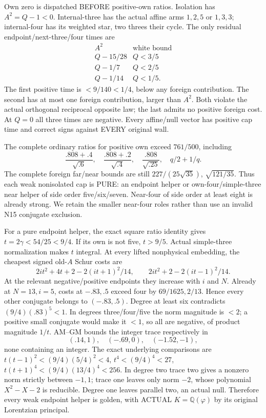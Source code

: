 \documentclass[11pt]{article}
\begin{document}
Own zero is dispatched BEFORE positive-own
ratios.
Isolation has \(A^2=Q-1<0\).
Internal-three has the actual affine arms
\(1,2,5\) or \(1,3,3\); internal-four has its
weighted star, two threes their cycle.
The only residual endpoint/next-three/four
times are
\[
 \begin{array}{c|c}
 A^2&\text{white bound}\\ \hline
 Q-15/28&Q<3/5\\
 Q-1/7&Q<2/5\\
 Q-1/14&Q<1/5 .
 \end{array}
\]
The first positive time is \(<9/140<1/4\),
below any foreign contribution.
The second has at most one foreign contribution,
larger than \(A^2\).
Both violate the actual orthogonal reciprocal
opposite law; the last admits no positive
foreign cost.
At \(Q=0\) all three times are negative.
Every affine/null vector has positive cap time
and correct signs against EVERY original wall.

The complete ordinary ratios for positive own
exceed \(761/500\), including
\[
 {\frac{.808+.4}{\sqrt{.6}}},\quad
 {\frac{.808+.2}{\sqrt{.4}}},\quad
 {\frac{.808}{\sqrt{.25}}},\quad q/2+1/q .
\]
The complete foreign far/near bounds are still
\(227/(25\sqrt{35})\), \(\sqrt{121/35}\).
Thus each weak nonisolated cap is PURE:
an endpoint helper or own-four/simple-three
near helper of side order five/six/seven.
Near-four of side order at least eight is
already strong.
We retain the smaller near-four roles rather
than use an invalid N15 conjugate exclusion.

For a pure endpoint helper, the exact square
ratio identity gives \(t=2\gamma<54/25<9/4\).
If its own is not five, \(t>9/5\).
Actual simple-three normalization makes \(t\)
integral.
At every lifted nonphysical embedding, the
cheapest signed old-\(A\) Schur costs are
\[
 2it^2+4t+2-2(it+1)^2/14,\qquad
 2it^2+2-2(it-1)^2/14 .
\]
At the relevant negative/positive endpoints
they increase with \(i\) and \(N\).
Already at \(N=13,i=5\), costs at \(-.83,.5\)
exceed four by \(69/1625,2/13\).
Hence every other conjugate belongs to
\((-.83,.5)\).
Degree at least six contradicts
\((9/4)(.83)^5<1\).
In degrees three/four/five the norm magnitude
is \(<2\); a positive small conjugate would
make it \(<1\), so all are negative, of product
magnitude \(1/t\).
AM--GM bounds the integer trace respectively in
\[
                         (.14,1),\quad(-.69,0),\quad(-1.52,-1),
\]
none containing an integer.
The exact underlying comparisons are
\(t(t-1)^2<(9/4)(5/4)^2<4\),
\(t^4<(9/4)^4<27\),
\(t(t+1)^4<(9/4)(13/4)^4<256\).
In degree two trace two gives a nonzero norm
strictly between \(-1,1\);
trace one leaves only norm \(-2\), whose
polynomial \(X^2-X-2\) is reducible.
Degree one leaves parallel two, an actual null.
Therefore every weak endpoint helper is golden,
with ACTUAL \(K=\mathbb Q(\varphi)\) by its
original Lorentzian principal.
\end{document}
